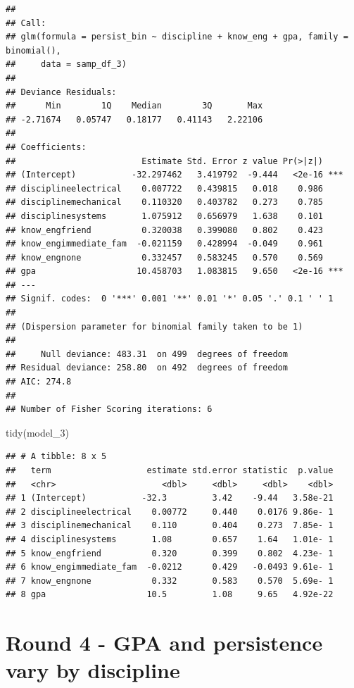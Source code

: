 \documentclass[
]{book}
\newenvironment{Shaded}{\begin{snugshade}}{\end{snugshade}}
\newcommand{\FunctionTok}[1]{\textcolor[rgb]{0.00,0.00,0.00}{#1}}
\newcommand{\NormalTok}[1]{#1}
\begin{document}
\begin{verbatim}
## 
## Call:
## glm(formula = persist_bin ~ discipline + know_eng + gpa, family = binomial(), 
##     data = samp_df_3)
## 
## Deviance Residuals: 
##      Min        1Q    Median        3Q       Max  
## -2.71674   0.05747   0.18177   0.41143   2.22106  
## 
## Coefficients:
##                         Estimate Std. Error z value Pr(>|z|)    
## (Intercept)           -32.297462   3.419792  -9.444   <2e-16 ***
## disciplineelectrical    0.007722   0.439815   0.018    0.986    
## disciplinemechanical    0.110320   0.403782   0.273    0.785    
## disciplinesystems       1.075912   0.656979   1.638    0.101    
## know_engfriend          0.320038   0.399080   0.802    0.423    
## know_engimmediate_fam  -0.021159   0.428994  -0.049    0.961    
## know_engnone            0.332457   0.583245   0.570    0.569    
## gpa                    10.458703   1.083815   9.650   <2e-16 ***
## ---
## Signif. codes:  0 '***' 0.001 '**' 0.01 '*' 0.05 '.' 0.1 ' ' 1
## 
## (Dispersion parameter for binomial family taken to be 1)
## 
##     Null deviance: 483.31  on 499  degrees of freedom
## Residual deviance: 258.80  on 492  degrees of freedom
## AIC: 274.8
## 
## Number of Fisher Scoring iterations: 6
\end{verbatim}

\begin{Shaded}
\begin{Highlighting}[]
\FunctionTok{tidy}\NormalTok{(model\_3)}
\end{Highlighting}
\end{Shaded}

\begin{verbatim}
## # A tibble: 8 x 5
##   term                   estimate std.error statistic  p.value
##   <chr>                     <dbl>     <dbl>     <dbl>    <dbl>
## 1 (Intercept)           -32.3         3.42    -9.44   3.58e-21
## 2 disciplineelectrical    0.00772     0.440    0.0176 9.86e- 1
## 3 disciplinemechanical    0.110       0.404    0.273  7.85e- 1
## 4 disciplinesystems       1.08        0.657    1.64   1.01e- 1
## 5 know_engfriend          0.320       0.399    0.802  4.23e- 1
## 6 know_engimmediate_fam  -0.0212      0.429   -0.0493 9.61e- 1
## 7 know_engnone            0.332       0.583    0.570  5.69e- 1
## 8 gpa                    10.5         1.08     9.65   4.92e-22
\end{verbatim}

\hypertarget{round-4---gpa-and-persistence-vary-by-discipline}{%
\section{Round 4 - GPA and persistence vary by discipline}\label{round-4---gpa-and-persistence-vary-by-discipline}}
\end{document}
